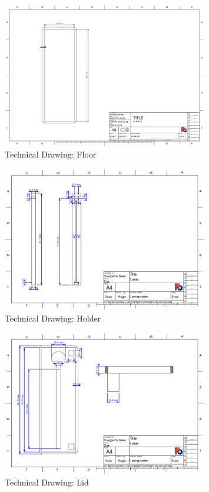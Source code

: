 \documentclass{report}
\begin{document}
\begin{figure}[H]
\centering  
\includegraphics[width=0.8\textwidth]{./fig/pcb_holder_floor_prot}   
\caption{Technical Drawing: Floor}
\end{figure} 


\begin{figure}[H]
\centering  
\includegraphics[width=0.8\textwidth]{./fig/pcb_holder_holder}   
\caption{Technical Drawing: Holder}
\end{figure} 

\begin{figure}[H]
\centering  
\includegraphics[width=0.8\textwidth]{./fig/pcb_holder_lid}  
\caption{Technical Drawing: Lid} 
\end{figure} 
\end{document}
